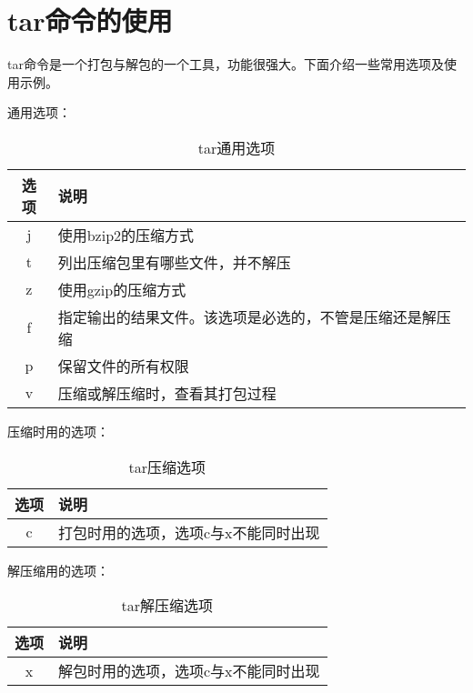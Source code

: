 \section{tar命令的使用}
\label{sec:tarCmd}

tar命令是一个打包与解包的一个工具，功能很强大。下面介绍一些常用选项及使
用示例。

通用选项：

\begin{table}[htbp]
  \centering
    \caption{tar通用选项}
    \label{tab:tarGeneralOpt}
    \begin{tabular}{cl}
      \toprule
      选项     & 说明 \\
      \midrule
      j        & 使用bzip2的压缩方式 \\
      t        & 列出压缩包里有哪些文件，并不解压 \\
      z        & 使用gzip的压缩方式 \\
      f        & 指定输出的结果文件。该选项是必选的，不管是压缩还是解压缩 \\
      p        & 保留文件的所有权限 \\
      v        & 压缩或解压缩时，查看其打包过程 \\
      \bottomrule
    \end{tabular}
\end{table}

压缩时用的选项：

\begin{table}[!htbp]
  \centering
    \caption{tar压缩选项}
    \label{tab:tarCompressOpt}
    \begin{tabular}{cl}
      \toprule
      选项     & 说明 \\
      \midrule
      c        & 打包时用的选项，选项c与x不能同时出现 \\
      \bottomrule
    \end{tabular}
\end{table}

解压缩用的选项：

\begin{table}[htbp]
  \centering
    \caption{tar解压缩选项}
    \label{tab:tarUncompressOpt}
    \begin{tabular}{cl}
      \toprule
      选项     & 说明 \\
      \midrule
      x        & 解包时用的选项，选项c与x不能同时出现 \\
      \bottomrule
    \end{tabular}
\end{table}


